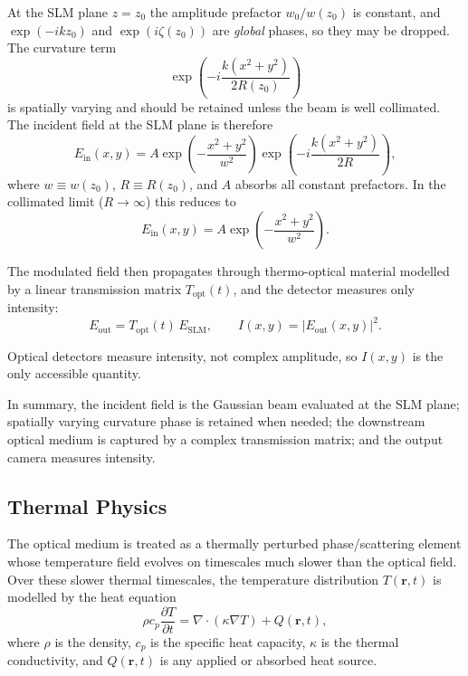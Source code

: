 \documentclass[11pt,letterpaper]{article}
\begin{document}
At the SLM plane $z=z_0$ the amplitude prefactor $w_0/w(z_0)$ is constant, and $\exp(-ikz_0)$ and $\exp(i\zeta(z_0))$ are \emph{global} phases, so they may be dropped. The curvature term
\[
\exp\!\left(-i\frac{k(x^2+y^2)}{2R(z_0)}\right)
\]
is spatially varying and should be retained unless the beam is well collimated. The incident field at the SLM plane is therefore
\begin{equation}
    E_{\mathrm{in}}(x,y) = A\exp\!\left(-\frac{x^2+y^2}{w^2}\right)
    \exp\!\left(-i\frac{k(x^2+y^2)}{2R}\right),
\end{equation}
where $w \equiv w(z_0)$, $R \equiv R(z_0)$, and $A$ absorbs all constant prefactors. In the collimated limit ($R\to\infty$) this reduces to
\begin{equation}
    E_{\mathrm{in}}(x,y) = A\exp\!\left(-\frac{x^2+y^2}{w^2}\right).
\end{equation}

The modulated field then propagates through thermo-optical material modelled by a linear
transmission matrix $T_{\mathrm{opt}}(t)$, and the detector measures only intensity:
\begin{equation}
    E_{\mathrm{out}} = T_{\mathrm{opt}}(t)\,E_{\mathrm{SLM}}, \qquad I(x,y) = \left|E_{\mathrm{out}}(x,y)\right|^2.
\end{equation}

Optical detectors measure intensity, not complex amplitude, so $I(x,y)$ is the
only accessible quantity.

In summary, the incident field is the Gaussian beam evaluated at the SLM plane; spatially
varying curvature phase is retained when needed; the downstream optical medium is captured
by a complex transmission matrix; and the output camera measures intensity.

\subsection{Thermal Physics}

The optical medium is treated as a thermally perturbed phase/scattering element whose temperature
field evolves on timescales much slower than the optical field. Over these slower thermal timescales,
the temperature distribution \(T(\mathbf{r},t)\) is modelled by the heat equation
\begin{equation}
\rho c_p \frac{\partial T}{\partial t}
=
\nabla \cdot (\kappa \nabla T) + Q(\mathbf{r},t),
\end{equation}
where \(\rho\) is the density, \(c_p\) is the specific heat capacity, \(\kappa\) is the thermal conductivity,
and \(Q(\mathbf{r},t)\) is any applied or absorbed heat source.
\end{document}

